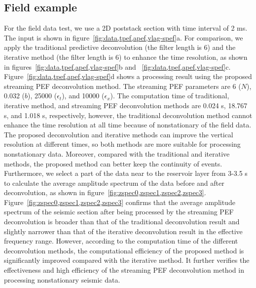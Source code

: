 \subsection{Field example}

For the field data test, we use a 2D poststack section with time interval of
2 ms. The input is shown in figure~\ref{fig:data,tpef,apef,vlag-spef}a. For
comparison, we apply the traditional predictive deconvolution (the filter
length is 6) and the iterative method (the filter length is 6) to enhance
the time resolution, as shown in figures~\ref{fig:data,tpef,apef,vlag-spef}b
and ~\ref{fig:data,tpef,apef,vlag-spef}c.
Figure~\ref{fig:data,tpef,apef,vlag-spef}d shows a processing result using
the proposed streaming PEF deconvolution method. The streaming PEF parameters
are 6 ($N$), 0.032 ($b$), 25000 ($\epsilon_t$), and 10000 ($\epsilon_x$).
The computation time of traditional, iterative method, and streaming
PEF deconvolution methods are 0.024 s, 18.767 s, and 1.018 s, respectively,
however, the traditional deconvolution method cannot enhance the time
resolution at all time because of nonstationary of the field data. The
proposed deconvolution and iterative methods can improve the vertical
resolution at different times, so both methods are more suitable for
processing nonstationary data. Moreover, compared with the traditional
and iterative methods, the proposed method can better keep the
continuity of events. Furthermore, we select a part of the data near to the
reservoir layer from 3-3.5 s to calculate the average amplitude spectrum of
the data before and after deconvolution, as shown in
figure~\ref{fig:zspec0,zspec1,zspec2,zspec3}.
Figure~\ref{fig:zspec0,zspec1,zspec2,zspec3} confirms that the average
amplitude spectrum of the seismic section after being processed by the
streaming PEF deconvolution is broader than that of the traditional
deconvolution result and slightly narrower than that of the iterative
deconvolution result in the effective frequency range. However, according to
the computation time of the different deconvolution methods, the
computational efficiency of the proposed method is significantly improved
compared with the iterative method. It further verifies the effectiveness
and high efficiency of the streaming PEF deconvolution method in processing
nonstationary seismic data.


